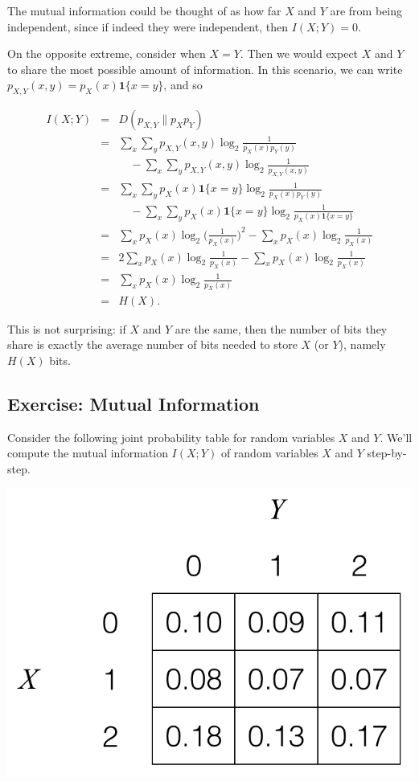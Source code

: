 \documentclass[6008notes.tex]{subfiles}
\begin{document}
The mutual information could be thought of as how far $X$ and $Y$ are from being independent, since if indeed they were independent, then $I(X;Y)=0$.

On the opposite extreme, consider when $X=Y$. Then we would expect $X$ and $Y$ to share the most possible amount of information. In this scenario, we can write $p_{X,Y}(x,y)=p_{X}(x)\mathbf{1}\{ x=y\}$, and so

\begin{eqnarray*}
I(X;Y)
&=&D(p_{X,Y}\parallel p_{X}p_{Y})\\
&=&\sum_{x}\sum_{y}p_{X,Y}(x,y)\log_{2}\frac{1}{p_{X}(x)p_{Y}(y)}\\
&&\quad
  -\sum_{x}\sum_{y}p_{X,Y}(x,y)\log_{2}\frac{1}{p_{X,Y}(x,y)}\\
&=&\sum_{x}\sum_{y}p_{X}(x)\mathbf{1}\{x=y\}\log_{2}\frac{1}{p_{X}(x)p_{Y}(y)}\\
&&\quad
  -\sum_{x}\sum_{y}p_{X}(x)\mathbf{1}\{x=y\}\log_{2}\frac{1}{p_{X}(x)\mathbf{1}\{x=y\}}\\
&=&\sum_{x}p_{X}(x)\log_{2}\Big(\frac{1}{p_{X}(x)}\Big)^{2}-\sum_{x}p_{X}(x)\log_{2}\frac{1}{p_{X}(x)}\\
&=&2\sum_{x}p_{X}(x)\log_{2}\frac{1}{p_{X}(x)}-\sum_{x}p_{X}(x)\log_{2}\frac{1}{p_{X}(x)}\\
&=&\sum_{x}p_{X}(x)\log_{2}\frac{1}{p_{X}(x)}\\
&=&H(X).
\end{eqnarray*}

This is not surprising: if $X$ and $Y$ are the same, then the number of bits they share is exactly the average number of bits needed to store $X$ (or $Y$), namely $H(X)$ bits.

\subsection{Exercise: Mutual Information}

Consider the following joint probability table for random variables $X$ and $Y$. We'll compute the mutual information $I(X;Y)$ of random variables $X$ and $Y$ step-by-step.

{\centering\includegraphics[scale=0.4]{images_sec-mutual-info-ex} \par}
\end{document}
